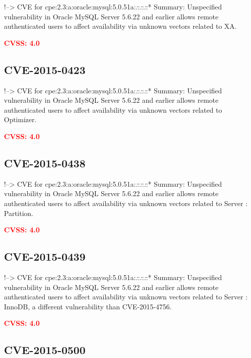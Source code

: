 \documentclass[a4paper, 12pt]{article}
\begin{document}
!--\textgreater{} CVE for
cpe:2.3:a:oracle:mysql:5.0.51a:\emph{:}:\emph{:}:\emph{:}:* Summary:
Unspecified vulnerability in Oracle MySQL Server 5.6.22 and earlier
allows remote authenticated users to affect availability via unknown
vectors related to XA.

\textbf{\textcolor{red}{CVSS: 4.0}}

\hypertarget{cve-2015-0423}{%
\subsection{CVE-2015-0423}\label{cve-2015-0423}}

!--\textgreater{} CVE for
cpe:2.3:a:oracle:mysql:5.0.51a:\emph{:}:\emph{:}:\emph{:}:* Summary:
Unspecified vulnerability in Oracle MySQL Server 5.6.22 and earlier
allows remote authenticated users to affect availability via unknown
vectors related to Optimizer.

\textbf{\textcolor{red}{CVSS: 4.0}}

\hypertarget{cve-2015-0438}{%
\subsection{CVE-2015-0438}\label{cve-2015-0438}}

!--\textgreater{} CVE for
cpe:2.3:a:oracle:mysql:5.0.51a:\emph{:}:\emph{:}:\emph{:}:* Summary:
Unspecified vulnerability in Oracle MySQL Server 5.6.22 and earlier
allows remote authenticated users to affect availability via unknown
vectors related to Server : Partition.

\textbf{\textcolor{red}{CVSS: 4.0}}

\hypertarget{cve-2015-0439}{%
\subsection{CVE-2015-0439}\label{cve-2015-0439}}

!--\textgreater{} CVE for
cpe:2.3:a:oracle:mysql:5.0.51a:\emph{:}:\emph{:}:\emph{:}:* Summary:
Unspecified vulnerability in Oracle MySQL Server 5.6.22 and earlier
allows remote authenticated users to affect availability via unknown
vectors related to Server : InnoDB, a different vulnerability than
CVE-2015-4756.

\textbf{\textcolor{red}{CVSS: 4.0}}

\hypertarget{cve-2015-0500}{%
\subsection{CVE-2015-0500}\label{cve-2015-0500}}
\end{document}
